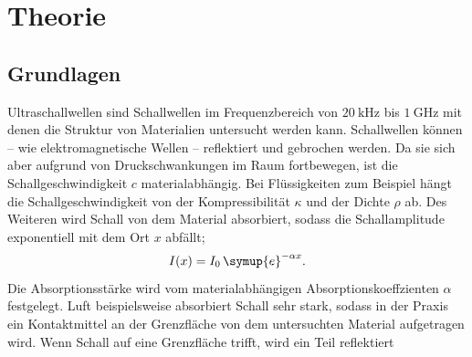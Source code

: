 \section{Theorie}
\label{sec:Theorie}

\subsection{Grundlagen}
Ultraschallwellen sind Schallwellen im Frequenzbereich von $\SI{20}{\kilo\hertz}$ bis
$\SI{1}{\giga\hertz}$ mit denen die Struktur von Materialien untersucht werden kann.
Schallwellen können -- wie elektromagnetische Wellen -- reflektiert und gebrochen werden.
Da sie sich aber aufgrund von Druckschwankungen im Raum fortbewegen, ist die
Schallgeschwindigkeit $c$ materialabhängig. Bei Flüssigkeiten zum Beispiel hängt die
Schallgeschwindigkeit von der Kompressibilität $\kappa$ und der Dichte $\rho$ ab.
Des Weiteren wird Schall von dem Material absorbiert, sodass die Schallamplitude exponentiell
mit dem Ort $x$ abfällt;
\begin{equation}
	\label{eqn:dampf}
	I(x) = I_0 \, \symup{e}^{-\alpha x} \mathrm{.}
\end{equation}
Die Absorptionsstärke wird vom materialabhängigen Absorptionskoeffzienten $\alpha$ festgelegt.
Luft beispielsweise absorbiert Schall sehr stark, sodass in der Praxis ein Kontaktmittel an der
Grenzfläche von dem untersuchten Material aufgetragen wird.
Wenn Schall auf eine Grenzfläche trifft, wird ein Teil reflektiert
